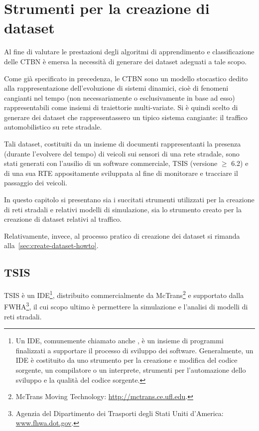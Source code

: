
\chapter{Strumenti per la creazione di dataset}
\label{cap:tsis-sensors}
Al fine di valutare le prestazioni degli algoritmi di apprendimento e classificazione delle \acl{CTBN} è emersa la necessità di generare dei dataset adeguati a tale scopo.

Come già specificato in precedenza, le \acs{CTBN} sono un modello stocastico dedito alla rappresentazione dell'evoluzione di sistemi dinamici, cioè di fenomeni cangianti nel tempo (non necessariamente o esclusivamente in base ad esso) rappresentabili come insiemi di traiettorie multi-variate. Si è quindi scelto di generare dei dataset che rappresentassero un tipico sistema cangiante: il traffico automobilistico su rete stradale.

Tali dataset, costituiti da un insieme di documenti rappresentanti la presenza (durante l'evolvere del tempo) di veicoli sui sensori di una rete stradale, sono stati generati con l'ausilio di un software commerciale, \acf{TSIS} (versione $\geq$ 6.2) e di una sua \acl{RTE} appositamente sviluppata al fine di monitorare e tracciare il passaggio dei veicoli.

In questo capitolo si presentano sia i succitati strumenti utilizzati per la creazione di reti stradali e relativi modelli di simulazione, sia lo strumento creato per la creazione di dataset relativi al traffico.

Relativamente, invece, al processo pratico di creazione dei dataset si rimanda alla~\autoref{sec:create-dataset-howto}.

\section{TSIS}
\label{sec:tsis}
\acf{TSIS} è un \acl{IDE}\footnote{Un \acl{IDE}, comunemente chiamato anche , è un insieme di programmi finalizzati a supportare il processo di sviluppo dei software. Generalmente, un \acs{IDE} è costituito da uno strumento per la creazione e modifica del codice sorgente, un compilatore o un interprete, strumenti per l'automazione dello sviluppo e la qualità del codice sorgente.}, distribuito commercialmente da McTrans\footnote{McTrans Moving Technology: \url{http://mctrans.ce.ufl.edu}.} e supportato dalla \acf{FWHA}\footnote{Agenzia del Dipartimento dei Trasporti degli Stati Uniti d'America: \\ \url{www.fhwa.dot.gov}.}, il cui scopo ultimo è permettere la simulazione e l'analisi di modelli di reti stradali.

